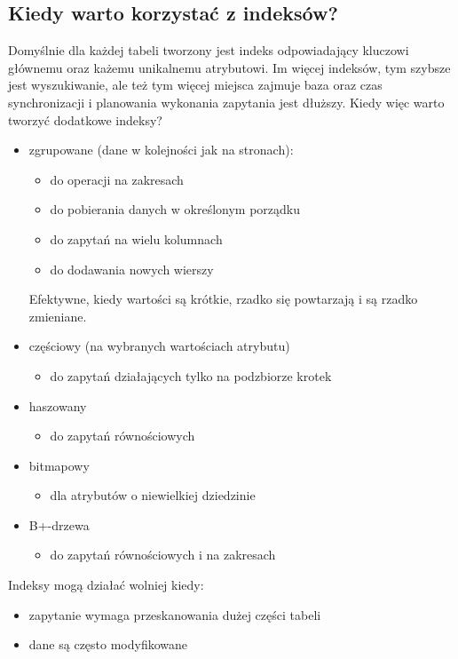 \subsection{Kiedy warto korzystać z indeksów?}
Domyślnie dla każdej tabeli tworzony jest indeks odpowiadający kluczowi głównemu oraz każemu unikalnemu atrybutowi.
Im więcej indeksów, tym szybsze jest wyszukiwanie, ale też tym więcej miejsca zajmuje baza oraz czas synchronizacji i planowania wykonania zapytania jest dłuższy.
Kiedy więc warto tworzyć dodatkowe indeksy?
\begin{itemize}
    \item zgrupowane (dane w kolejności jak na stronach):
    \begin{itemize}
        \item do operacji na zakresach
        \item do pobierania danych w określonym porządku
        \item do zapytań na wielu kolumnach
        \item do dodawania nowych wierszy
    \end{itemize}
    Efektywne, kiedy wartości są krótkie, rzadko się powtarzają i są rzadko zmieniane.
    \item częściowy (na wybranych wartościach atrybutu)
    \begin{itemize}
        \item do zapytań działających tylko na podzbiorze krotek
    \end{itemize}
    \item haszowany
    \begin{itemize}
        \item do zapytań równościowych
    \end{itemize}
    \item bitmapowy
    \begin{itemize}
        \item dla atrybutów o niewielkiej dziedzinie
    \end{itemize}
    \item B+-drzewa
    \begin{itemize}
        \item do zapytań równościowych i na zakresach
    \end{itemize}
\end{itemize}

Indeksy mogą działać wolniej kiedy:
\begin{itemize}
    \item zapytanie wymaga przeskanowania dużej części tabeli
    \item dane są często modyfikowane
\end{itemize}
